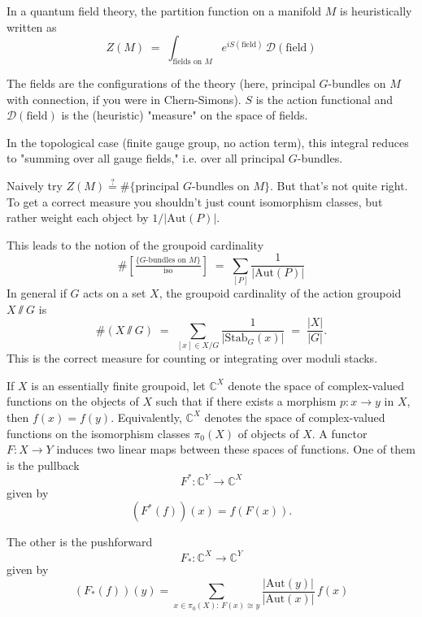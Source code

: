 \documentclass[12pt]{article}
\begin{document}
\begin{remark}
    In a quantum field theory, the partition function on a manifold $M$ is heuristically written as
    \[Z(M) \;=\; \int_{\text{fields on }M} e^{iS(\text{field})}\, \mathcal{D}(\text{field})\]

    The fields are the configurations of the theory (here, principal $G$-bundles on $M$ with connection, if you were in Chern-Simons).
    $S$ is the action functional and $\mathcal{D}(\text{field})$ is the (heuristic) "measure" on the space of fields.

    In the topological case (finite gauge group, no action term), this integral reduces to "summing over all gauge fields," i.e. over all principal $G$-bundles.
\end{remark}

\begin{remark}
    Naively try $Z(M) \stackrel{?}{=} \#\{\text{principal $G$-bundles on $M$}\}$.
    But that's not quite right. To get a correct measure you shouldn't just count isomorphism classes, but rather weight each object by $1/|\mathrm{Aut}(P)|$.

    This leads to the notion of the groupoid cardinality
    \[\#\!\!\left[\tfrac{\{\text{$G$-bundles on $M$}\}}{\text{iso}}\right]
        \;=\; \sum_{[P]} \frac{1}{|\mathrm{Aut}(P)|}\]
    In general if $G$ acts on a set $X$, the groupoid cardinality of the action groupoid $X\sslash G$ is
    \[\#(X\sslash G) \;=\; \sum_{[x]\in X/G} \frac{1}{|\mathrm{Stab}_G(x)|} \;=\; \frac{|X|}{|G|}.\]
    This is the correct measure for counting or integrating over moduli stacks. 
\end{remark}

If $X$ is an essentially finite groupoid, let $\mathbb{C}^X$ denote the space of complex-valued functions on the objects of $X$ such that if there exists a morphism $p : x \to y$ in $X$, then $f(x)=f(y)$. Equivalently, $\mathbb{C}^X$ denotes the space of complex-valued functions on the isomorphism classes $\pi_0(X)$ of objects of $X$. A functor $F : X \to Y$ induces two linear maps between these spaces of functions. One of them is the pullback
\[
    F^* : \mathbb{C}^Y \to \mathbb{C}^X
\]
given by
\[
    (F^*(f))(x) = f(F(x)).
\]

The other is the pushforward
\[
    F_* : \mathbb{C}^X \to \mathbb{C}^Y
\]
given by
\[
    (F_*(f))(y) = \sum_{x \in \pi_0(X):\,F(x)\cong y} \frac{|\mathrm{Aut}(y)|}{|\mathrm{Aut}(x)|}\, f(x)
\]
\end{document}
